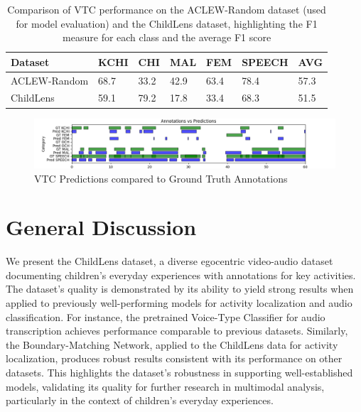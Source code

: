 \documentclass[
  man,floatsintext]{apa6}
\begin{document}
\begin{table}[tbp]

\begin{center}
\begin{threeparttable}

\caption{\label{tab:vtc-results}Comparison of VTC performance on the ACLEW-Random dataset (used for model evaluation) and the ChildLens dataset, highlighting the F1  measure for each class and the average F1 score}

\begin{tabular}{lllllll}
\toprule
Dataset & \multicolumn{1}{c}{KCHI} & \multicolumn{1}{c}{CHI} & \multicolumn{1}{c}{MAL} & \multicolumn{1}{c}{FEM} & \multicolumn{1}{c}{SPEECH} & \multicolumn{1}{c}{AVG}\\
\midrule
ACLEW-Random & 68.7 & 33.2 & 42.9 & 63.4 & 78.4 & 57.3\\
ChildLens & 59.1 & 79.2 & 17.8 & 33.4 & 68.3 & 51.5\\
\bottomrule
\end{tabular}

\end{threeparttable}
\end{center}

\end{table}

\begin{figure}

{\centering \includegraphics[width=6.67in]{images/vtc_performance_evaluation} 

}

\caption{VTC Predictions compared to Ground Truth Annotations}\label{fig:vtc-evaluations}
\end{figure}

\section{General Discussion}\label{general-discussion}

We present the ChildLens dataset, a diverse egocentric video-audio dataset documenting children's everyday experiences with annotations for key activities. The dataset's quality is demonstrated by its ability to yield strong results when applied to previously well-performing models for activity localization and audio classification. For instance, the pretrained Voice-Type Classifier for audio transcription achieves performance comparable to previous datasets. Similarly, the Boundary-Matching Network, applied to the ChildLens data for activity localization, produces robust results consistent with its performance on other datasets. This highlights the dataset's robustness in supporting well-established models, validating its quality for further research in multimodal analysis, particularly in the context of children's everyday experiences.
\end{document}
